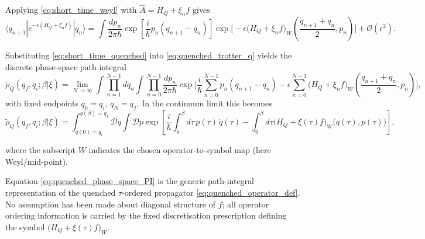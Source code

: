 \begin{widetext}
Applying \eqref{eq:short_time_weyl} with $\hat A = H_Q+\xi_n f$ gives
\begin{equation}
    \langle q_{n+1}|e^{-\epsilon(H_Q+\xi_n f)}|q_n\rangle
    = \int\frac{dp_n}{2\pi\hbar} \exp\!\left[\frac{i}{\hbar}p_n(q_{n+1}-q_n)\right] \exp\!\bigg[ -\epsilon \big(H_Q+\xi_n f\big)_W \left(\frac{q_{n+1}+q_n}{2},p_n\right) \bigg] +\mathcal O(\epsilon^2).
    \label{eq:short_time_quenched}
\end{equation}

Substituting \eqref{eq:short_time_quenched} into \eqref{eq:quenched_trotter_q} yields the discrete phase-space path integral
\begin{equation}
    \tilde\rho_Q(q_f,q_i;\beta|\xi) = \lim_{N\to\infty} \int \prod_{n=1}^{N-1} dq_n \int \prod_{n=0}^{N-1}\frac{dp_n}{2\pi\hbar} \exp\!\Bigg[ \frac{i}{\hbar}\sum_{n=0}^{N-1} p_n(q_{n+1}-q_n) -\epsilon\sum_{n=0}^{N-1} \big(H_Q+\xi_n f\big)_W\!\left(\frac{q_{n+1}+q_n}{2},p_n\right) \Bigg],
    \label{eq:quenched_discrete_phase_space}
\end{equation}
with fixed endpoints $q_0=q_i$, $q_N=q_f$. In the continuum limit this becomes
\begin{equation}
    \tilde\rho_Q(q_f,q_i;\beta|\xi) = \int_{q(0)=q_i}^{q(\beta)=q_f}\!\!\mathcal D q \int \mathcal D p \exp\!\left[ \frac{i}{\hbar}\int_0^\beta d\tau\, p(\tau)\,\dot q(\tau) -\int_0^\beta d\tau \big(H_Q+\xi(\tau) f\big)_W\!\big(q(\tau),p(\tau)\big) \right],
    \label{eq:quenched_phase_space_PI}
\end{equation}
\end{widetext}
where the subscript $W$ indicates the chosen operator-to-symbol map (here Weyl/mid-point).

Equation \eqref{eq:quenched_phase_space_PI} is the generic path-integral representation
of the quenched $\tau$-ordered propagator \eqref{eq:quenched_operator_def}. No assumption
has been made about diagonal structure of $f$; all operator ordering information is
carried by the fixed discretisation prescription defining the symbol
$\big(H_Q+\xi(\tau)f\big)_W$.
